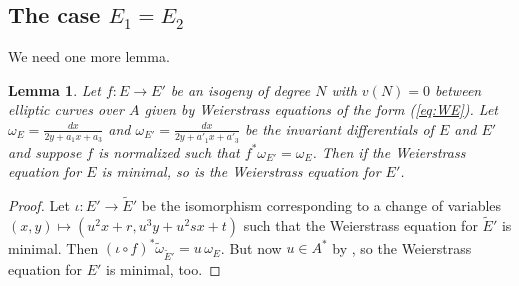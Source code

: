 \documentclass[11pt]{amsart}
\newtheorem{lemma}[prop]{Lemma}
\theoremstyle{definition}
\begin{document}
\subsection{The case $E_1 = E_2$}

We need one more lemma.

\begin{lemma}\label{lem:minimal}
    Let $f : E \to E'$ be an isogeny of degree $N$ with $v(N)=0$ between elliptic curves over $A$ given by Weierstrass equations of the form (\ref{eq:WE}). Let $\omega_E = \frac{dx}{2y+a_1x+a_3}$ and $\omega_{E'}=\frac{dx}{2y + a'_1x+a'_3}$ be the invariant differentials of $E$ and $E'$ and suppose $f$ is normalized such that $f^*\omega_{E'} = \omega_E$. Then if the Weierstrass equation for $E$ is minimal, so is the Weierstrass equation for $E'$.  
\end{lemma}

\begin{proof}
    Let $\iota : E'\to \tilde{E}'$ be the isomorphism corresponding to a change of variables $(x,y) \mapsto (u^2x + r, u^3y + u^2sx + t)$ such that the Weierstrass equation for $\tilde{E}'$ is minimal. Then $(\iota\circ f)^*\tilde\omega_{\tilde{E}'} = u\,\omega_E$. But now $u\in A^*$ by \cite[Lemmas 4.3 and 4.4]{DD15}, so the Weierstrass equation for $E'$ is minimal, too.
\end{proof}
\end{document}
